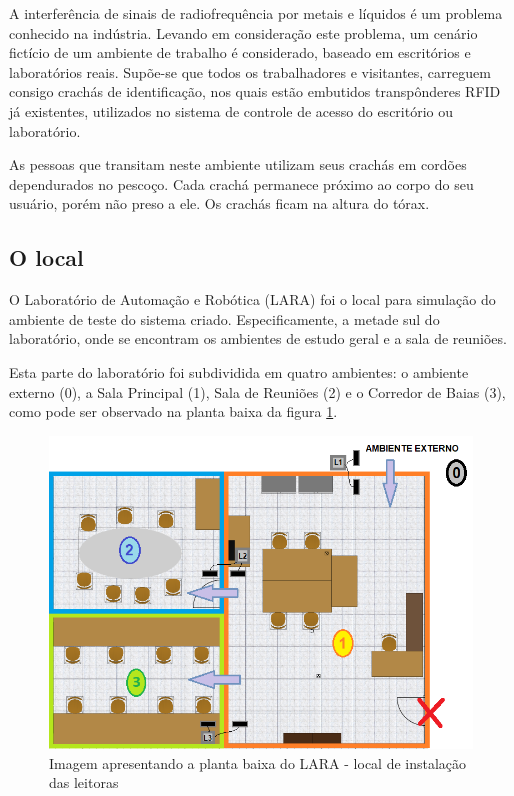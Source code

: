  A interferência de sinais de radiofrequência por metais e líquidos  é um problema conhecido na indústria. Levando em consideração este problema, um cenário fictício de um ambiente de trabalho é considerado, baseado em escritórios e laboratórios reais. Supõe-se que todos os trabalhadores e visitantes, carreguem consigo crachás de identificação, nos quais estão embutidos transpônderes RFID já existentes, utilizados no sistema de controle de acesso do escritório ou laboratório.
 
 As pessoas que transitam neste ambiente utilizam seus crachás em cordões dependurados no pescoço. Cada crachá permanece próximo ao corpo do seu usuário, porém não preso a ele. Os crachás ficam na altura do tórax.
 
 \subsection{O local}
 

 O Laboratório de Automação e Robótica (LARA) foi o local para simulação do ambiente de teste do sistema criado. Especificamente, a metade sul do laboratório, onde se encontram os ambientes de estudo geral e a sala de reuniões.
 
 Esta parte do laboratório foi subdividida em quatro ambientes: o ambiente externo (0), a Sala Principal (1), Sala de Reuniões (2) e o Corredor de Baias (3), como pode ser observado na planta baixa da figura \ref{fig:LARA_planta}.

  \begin{figure}[H]
    \centering
    \includegraphics[width=0.9\linewidth]{figs/Metodologia/LARA_planta_ambientes.png}
    \caption{Imagem apresentando a planta baixa do LARA - local de instalação das leitoras}
    \label{fig:LARA_planta}
\end{figure}

